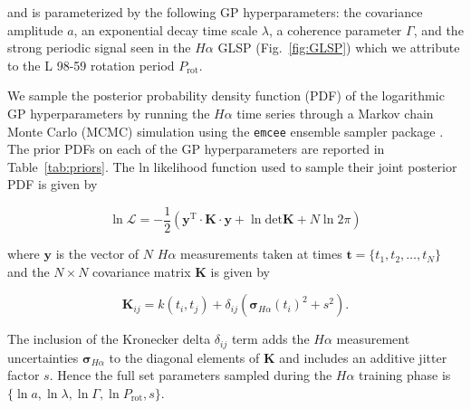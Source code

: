 \documentclass[longauth]{aa}
\newcommand{\prot}{$P_{\text{rot}}$}
\begin{document}
\noindent and is parameterized by the following GP hyperparameters: the covariance amplitude $a$, an exponential decay time scale $\lambda$, a coherence parameter $\Gamma$, and the strong periodic signal seen in the $H\alpha$ GLSP (Fig.~\ref{fig:GLSP}) which we attribute to the L 98-59 rotation period \prot{.} 

We sample the posterior probability density function (PDF) of the logarithmic GP hyperparameters by running the $H\alpha$ time series through a Markov chain Monte Carlo (MCMC) simulation using the \texttt{emcee} ensemble sampler package \citep{foremanmackey13}. The prior PDFs on each of the GP hyperparameters are reported in Table~\ref{tab:priors}. The ln likelihood function used to sample their joint posterior PDF is given by 

\begin{equation}
    \ln{\mathcal{L}} = -\frac{1}{2} \left( \mathbf{y}^{\text{T}}\cdot \mathbf{K}\cdot \mathbf{y} + \ln{\text{det}\mathbf{K}} + N\ln{2\pi} \right)
\end{equation}

\noindent where $\textbf{y}$ is the vector of $N$ $H\alpha$ measurements taken at times $\mathbf{t}=\{t_1,t_2,\dots,t_N \}$ and the $N \times N$ covariance matrix $\mathbf{K}$ is given by

\begin{equation}
    \mathbf{K}_{ij} = k(t_i,t_j) + \delta_{ij}(\boldsymbol{\sigma}_{H\alpha}(t_i)^2 + s^2).
\end{equation}

\noindent The inclusion of the Kronecker delta $\delta_{ij}$ term adds the $H\alpha$ measurement uncertainties $\boldsymbol{\sigma}_{H\alpha}$ to the diagonal elements of $\mathbf{K}$ and includes an additive jitter factor $s$. Hence the full set parameters sampled during the $H\alpha$ training phase is $\{ \ln{a}, \ln{\lambda}, \ln{\Gamma}, \ln{P_{\text{rot}}}, s \}$.
\end{document}
